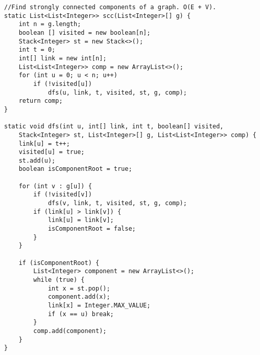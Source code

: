 \begin{verbatim}
//Find strongly connected components of a graph. O(E + V).
static List<List<Integer>> scc(List<Integer>[] g) {
	int n = g.length;
	boolean [] visited = new boolean[n];
	Stack<Integer> st = new Stack<>();
	int t = 0;
	int[] link = new int[n];
	List<List<Integer>> comp = new ArrayList<>();
	for (int u = 0; u < n; u++)
		if (!visited[u])
			dfs(u, link, t, visited, st, g, comp);
	return comp;
}

static void dfs(int u, int[] link, int t, boolean[] visited,
	Stack<Integer> st, List<Integer>[] g, List<List<Integer>> comp) {
	link[u] = t++;
	visited[u] = true;
	st.add(u);
	boolean isComponentRoot = true;

	for (int v : g[u]) {
		if (!visited[v])
			dfs(v, link, t, visited, st, g, comp);
		if (link[u] > link[v]) {
			link[u] = link[v];
			isComponentRoot = false;
		}
	}

	if (isComponentRoot) {
		List<Integer> component = new ArrayList<>();
		while (true) {
			int x = st.pop();
			component.add(x);
			link[x] = Integer.MAX_VALUE;
			if (x == u)	break;
		}
		comp.add(component);
	}
}
\end{verbatim}
